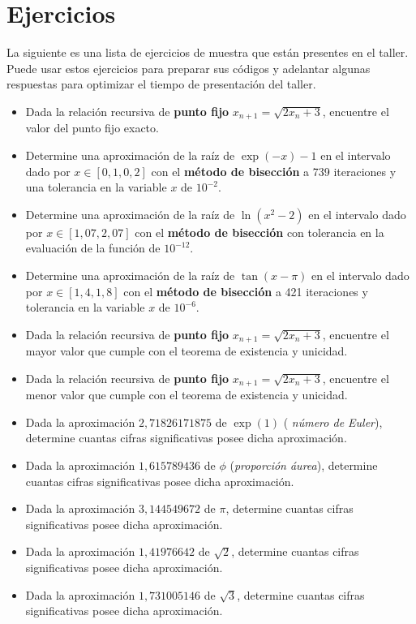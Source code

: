 \documentclass[12pt]{article}
\begin{document}
  \section{Ejercicios}
  La siguiente es una lista de ejercicios de muestra que están presentes en el taller. Puede usar estos ejercicios para preparar sus códigos y adelantar algunas respuestas para optimizar el tiempo de presentación del taller.
\begin{itemize}
\item Dada la relación recursiva de \textbf{punto fijo} \(x_{n+1}=\sqrt{2x_n+3}\), encuentre el valor del punto fijo exacto.
\item Determine una aproximación de la raíz de \(\exp (-x) - 1\) en el intervalo dado por \(x \in \left[0{,}1, 0{,}2\right]\) con el \textbf{método de bisección} a 739 iteraciones y una tolerancia en la variable \(x\) de \(10^{-2}\).
\item Determine una aproximación de la raíz de \(\ln(x^2-2)\) en el intervalo dado por \(x \in \left[ 1{,}07, 2{,}07 \right]\) con el \textbf{método de bisección} con tolerancia en la evaluación de la función de \(10^{-12}\).
\item Determine una aproximación de la raíz de \(\tan(x - \pi)\) en el intervalo dado por \(x \in \left[ 1{,}4, 1{,}8 \right]\) con el \textbf{método de bisección} a 421 iteraciones y tolerancia en la variable \(x\) de \(10^{-6}\).
\item Dada la relación recursiva de \textbf{punto fijo} \(x_{n+1}=\sqrt{2x_n+3}\), encuentre el mayor valor que cumple con el teorema de existencia y unicidad.
\item Dada la relación recursiva de \textbf{punto fijo} \(x_{n+1}=\sqrt{2x_n+3}\), encuentre el menor valor que cumple con el teorema de existencia y unicidad.
\item Dada la aproximación \(2{,}71826171875\) de \(\exp(1)\) (\textit{ número de Euler}), determine cuantas cifras significativas posee dicha aproximación.
\item Dada la aproximación \(1{,}615789436\) de \(\phi\) (\textit{proporción áurea}), determine cuantas cifras significativas posee dicha aproximación.
\item Dada la aproximación \(3{,}144549672\) de \(\pi\), determine cuantas cifras significativas posee dicha aproximación.
\item Dada la aproximación \(1{,}41976642\) de \(\sqrt{2}\), determine cuantas cifras significativas posee dicha aproximación.
\item Dada la aproximación \(1{,}731005146\) de \(\sqrt{3}\), determine cuantas cifras significativas posee dicha aproximación.

\end{itemize}
\end{document}
